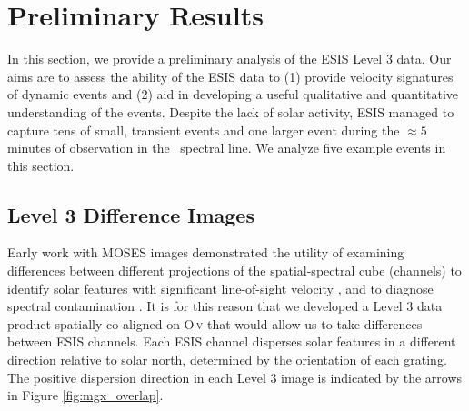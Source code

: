 \section{Preliminary Results}
 
	   In this section, we provide a preliminary analysis of the ESIS Level 3 data. Our aims are to assess the ability of the ESIS data to (1) provide velocity signatures of dynamic events and (2) aid in developing a useful qualitative and quantitative understanding of the events.
	   Despite the lack of solar activity, ESIS managed to capture tens of small, transient events and one larger event during the $\approx 5$ minutes of observation in the \ov \ spectral line.  
	   We analyze five example events in this section.  
	   
		
	   
    \subsection{Level 3 Difference Images} \label{sec:dif_images} 
    	Early work with MOSES images demonstrated the utility of examining differences between different projections of the spatial-spectral cube (channels) to identify solar features with significant line-of-sight velocity \citep{Fox10,FoxPhD,RustPhD,Rust2019}, and to diagnose spectral contamination \citep{RustPhD, Rust2019}.
    	It is for this reason that we developed a Level 3 data product spatially co-aligned on O\,\textsc{v} %
    	that would allow us to take differences between ESIS channels.
    	Each ESIS channel disperses solar features in a different direction relative to solar north, determined by the orientation of each grating.
    	The positive dispersion direction in each Level 3 image is indicated by the arrows  in Figure \ref{fig:mgx_overlap}.
    	
